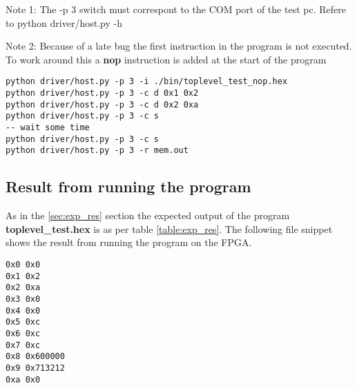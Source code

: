Note 1: The -p 3 switch must correspont to the COM port of the test pc. Refere to python driver/host.py -h

Note 2: Because of a late bug the first instruction in the program is not executed. To work around this a {\bf nop} instruction 
is added at the start of the program

\begin{verbatim}
python driver/host.py -p 3 -i ./bin/toplevel_test_nop.hex
python driver/host.py -p 3 -c d 0x1 0x2
python driver/host.py -p 3 -c d 0x2 0xa
python driver/host.py -p 3 -c s
-- wait some time
python driver/host.py -p 3 -c s
python driver/host.py -p 3 -r mem.out
\end{verbatim}

\subsection{Result from running the program}
As in the \ref{sec:exp_res} section the expected output of the program {\bf toplevel\_test.hex} is as per table \ref{table:exp_res}.
The following file snippet shows the result from running the program on the FPGA.

\begin{verbatim}
0x0 0x0
0x1 0x2
0x2 0xa
0x3 0x0
0x4 0x0
0x5 0xc
0x6 0xc
0x7 0xc
0x8 0x600000
0x9 0x713212
0xa	0x0
\end{verbatim}
